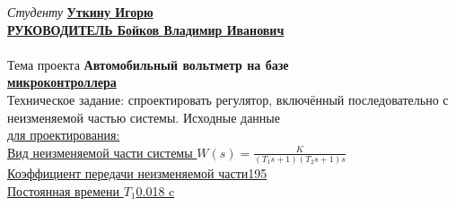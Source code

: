\documentclass[fleqn, a4paper, 12pt, russian]{article}
\begin{document}
	\flushleft
	{\fontsize{14pt}{0cm}\selectfont \textit{Студенту} \bfseries\hspace{1cm}\underline{\hspace{0.25cm}Уткину Игорю\hspace{9.5cm}}} \\ \vspace{0.5cm}
	{\fontsize{14pt}{0cm}\selectfont \bfseries \underline{РУКОВОДИТЕЛЬ \hspace{3.19cm} Бойков Владимир Иванович\hspace{2.5cm}}}\\ \vspace{0.3cm}
	\underline{\hspace{\textwidth}} \\ \vspace{0.3cm}
	{\fontsize{14pt}{0cm}\hspace{0.5cm}Тема проекта \hspace{1cm}\bfseries Автомобильный вольтметр на базе\\ \underline{\hspace{4.8cm}микроконтроллера\hspace{8.25cm}}} \\ \vspace{0.3cm}
	{\fontsize{14pt}{0cm}\hspace{0.5cm}Техническое задание: спроектировать регулятор, включённый последовательно с неизменяемой частью системы. Исходные данные\\ \underline{для проектирования:\hspace{12.4cm}}} \\ \vspace{0.2cm}
	{\fontsize{14pt}{0cm}\selectfont \underline{Вид неизменяемой части системы \hspace{3cm}$W(s) = \displaystyle{\frac{K}{(T_1s + 1)(T_2s + 1)s}}$\hspace{0.2cm}}} \\ \vspace{0.2cm}
	{\fontsize{14pt}{0cm}\selectfont \underline{Коэффициент передачи неизменяемой части\hspace{5.8cm}195\hspace{0.7cm}}} \\ \vspace{0.2cm}
	{\fontsize{14pt}{0cm}\selectfont \underline{Постоянная времени $T_1$\hspace{9.8cm}0.018 c\hspace{0.4cm}}} \\ \vspace{0.2cm}
\end{document}

